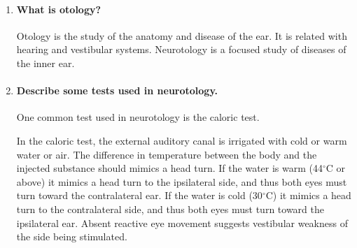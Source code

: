 \documentclass[12pt,article,oneside,a4paper]{memoir}
\begin{document}
\begin{enumerate}

\item \paragraph{What is otology?}
Otology is the study of the anatomy and disease of the ear. It is related with
hearing and vestibular systems. Neurotology is a focused study of diseases of
the inner ear.

\item \paragraph{Describe some tests used in neurotology.}
One common test used in neurotology is the caloric test.

In the caloric test, the external auditory canal is irrigated with cold or warm
water or air. The difference in temperature between the body and the injected
substance should mimics a head turn. If the water is warm (44$^{\circ}$C or
above) it mimics a head turn to the ipsilateral side, and thus both eyes must
turn toward the contralateral ear. If the water is cold (30$^{\circ}$C) it
mimics a head turn to the contralateral side, and thus both eyes must turn
toward the ipsilateral ear. Absent reactive eye movement suggests vestibular
weakness of the side being stimulated.

\end{enumerate}
\end{document}
